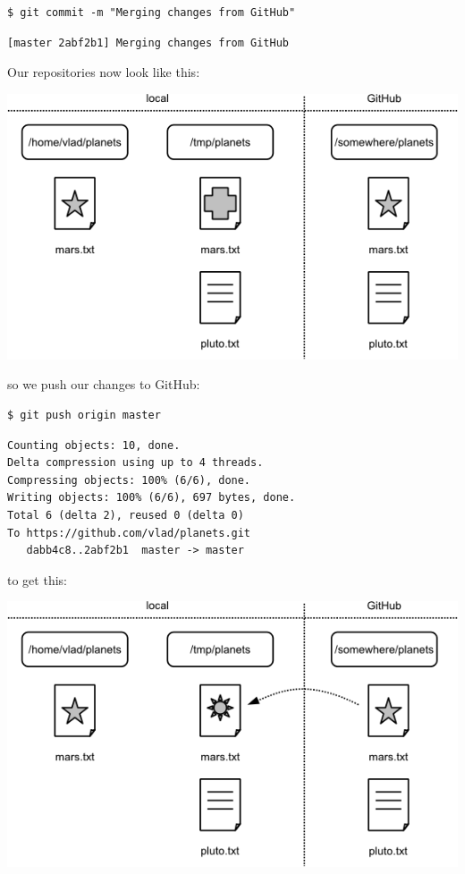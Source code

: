 \documentclass{book}
\begin{document}
\begin{verbatim}
$ git commit -m "Merging changes from GitHub"
\end{verbatim}

\begin{verbatim}
[master 2abf2b1] Merging changes from GitHub
\end{verbatim}

Our repositories now look like this:

\includegraphics{novice/git/img/git-after-second-conflicting-change.png}

so we push our changes to GitHub:

\begin{verbatim}
$ git push origin master
\end{verbatim}

\begin{verbatim}
Counting objects: 10, done.
Delta compression using up to 4 threads.
Compressing objects: 100% (6/6), done.
Writing objects: 100% (6/6), 697 bytes, done.
Total 6 (delta 2), reused 0 (delta 0)
To https://github.com/vlad/planets.git
   dabb4c8..2abf2b1  master -> master
\end{verbatim}

to get this:

\includegraphics{novice/git/img/git-after-merging.png}
\end{document}
